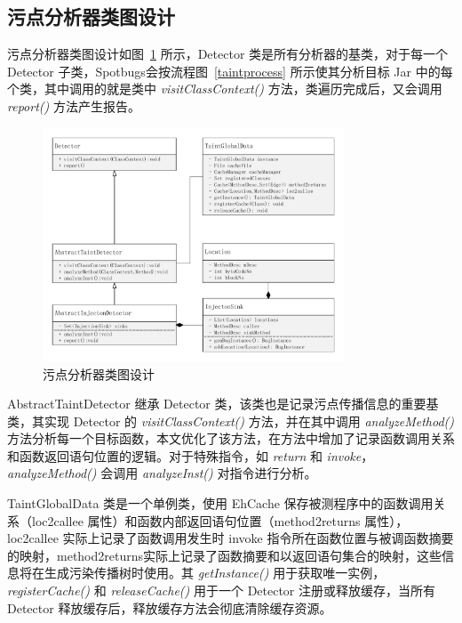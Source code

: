 \subsection{污点分析器类图设计}

污点分析器类图设计如图~\ref{taintDetectorClass} 所示，Detector 类是所有分析器的基类，对于每一个 Detector 子类，Spotbugs会按流程图~\ref{taintprocess} 所示使其分析目标 Jar 中的每个类，其中调用的就是类中 \textit{visitClassContext()} 方法，类遍历完成后，又会调用 \textit{report()} 方法产生报告。

\begin{figure}[!htb]
	\centering
	\includegraphics[width=0.8\textwidth]{FIGs/chapter3/taintDetectorClass.pdf}
	\caption{污点分析器类图设计}\label{taintDetectorClass}
\end{figure}

AbstractTaintDetector 继承 Detector 类，该类也是记录污点传播信息的重要基类，其实现 Detector 的 \textit{visitClassContext()} 方法，并在其中调用 \textit{analyzeMethod()} 方法分析每一个目标函数，本文优化了该方法，在方法中增加了记录函数调用关系和函数返回语句位置的逻辑。对于特殊指令，如 \textit{return} 和 \textit{invoke}，\textit{analyzeMethod()} 会调用  \textit{analyzeInst()} 对指令进行分析。

TaintGlobalData 类是一个单例类，使用 EhCache 保存被测程序中的函数调用关系（loc2callee 属性）和函数内部返回语句位置（method2returns 属性），loc2callee 实际上记录了函数调用发生时 invoke 指令所在函数位置与被调函数摘要的映射，method2returns实际上记录了函数摘要和以返回语句集合的映射，这些信息将在生成污染传播树时使用。其 \textit{getInstance()} 用于获取唯一实例，\textit{registerCache()} 和 \textit{releaseCache()} 用于一个 Detector 注册或释放缓存，当所有 Detector 释放缓存后，释放缓存方法会彻底清除缓存资源。

